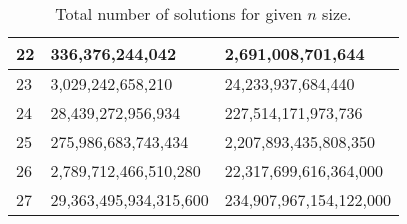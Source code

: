 \begin{table}[H]
\begin{tabular}{|l||l|l|}
22 & 336,376,244,042        & 2,691,008,701,644       \\ \hline
23 & 3,029,242,658,210      & 24,233,937,684,440      \\ \hline
24 & 28,439,272,956,934     & 227,514,171,973,736     \\ \hline
25 & 275,986,683,743,434    & 2,207,893,435,808,350   \\ \hline
26 & 2,789,712,466,510,280  & 22,317,699,616,364,000  \\ \hline
27 & 29,363,495,934,315,600 & 234,907,967,154,122,000 \\ \hline
\end{tabular}
\caption{\label{tab:solutions}Total number of solutions for given \(n\) size.}
\end{table}